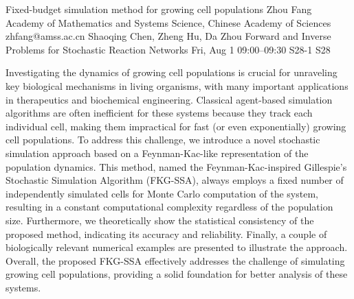 \begin{talk}
  {Fixed-budget simulation method for growing cell populations}%
  {Zhou Fang}%
  {Academy of Mathematics and Systems Science, Chinese Academy of Sciences}%
  {zhfang@amss.ac.cn}%
  {Shaoqing Chen, Zheng Hu, Da Zhou}%
  {Forward and Inverse Problems for Stochastic Reaction Networks}%
  {Fri, Aug 1 09:00–09:30}%
  {S28-1}%
  {S28}%
				
			
Investigating the dynamics of growing cell populations is crucial for unraveling key biological mechanisms in living organisms, with many important applications in therapeutics and biochemical engineering. Classical agent-based simulation algorithms are often inefficient for these systems because
they track each individual cell, making them impractical for fast (or even exponentially) growing
cell populations. To address this challenge, we introduce a novel stochastic simulation approach
based on a Feynman-Kac-like representation of the population dynamics. This method, named the
Feynman-Kac-inspired Gillespie’s Stochastic Simulation Algorithm (FKG-SSA), always employs a
fixed number of independently simulated cells for Monte Carlo computation of the system, resulting in a constant computational complexity regardless of the population size. Furthermore, we
theoretically show the statistical consistency of the proposed method, indicating its accuracy and
reliability. Finally, a couple of biologically relevant numerical examples are presented to illustrate the
approach. Overall, the proposed FKG-SSA effectively addresses the challenge of simulating growing
cell populations, providing a solid foundation for better analysis of these systems.


\end{talk}

